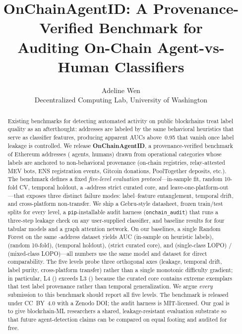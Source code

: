 \documentclass[10pt]{article}
\title{OnChainAgentID: A Provenance-Verified Benchmark for \\
Auditing On-Chain Agent-vs-Human Classifiers}
\author{%
  Adeline Wen \\
  Decentralized Computing Lab, University of Washington%
}
\date{}
\begin{document}
\maketitle

\begin{abstract}
Existing benchmarks for detecting automated activity on public blockchains treat label quality as an afterthought: addresses are labeled by the same behavioral heuristics that serve as classifier features, producing apparent AUCs above~0.95 that vanish once label leakage is controlled. We release \textbf{OnChainAgentID}, a provenance-verified benchmark of \datasetNAddresses{} Ethereum addresses (\datasetNAgents{} agents, \datasetNHumans{} humans) drawn from \datasetNCategories{} operational categories whose labels are anchored to non-behavioral provenance (on-chain registries, relay-attested MEV bots, ENS registration events, Gitcoin donations, PoolTogether deposits, etc.). The benchmark defines a fixed \emph{five-level evaluation protocol}---in-sample fit, random 10-fold CV, temporal holdout, a \datasetStrictCoreN{}-address strict curated core, and leave-one-platform-out---that exposes three distinct failure modes: label--feature entanglement, temporal drift, and cross-platform non-transfer. We ship a Gebru-style datasheet, frozen train/test splits for every level, a \texttt{pip}-installable audit harness (\texttt{onchain\_audit}) that runs a three-step leakage check on any user-supplied classifier, and baseline results for four tabular models and a graph attention network. %
On our baselines, a single Random Forest on the same \datasetNAddresses{}-address dataset yields AUC \cascadeLevelLeakyAuc{} (in-sample on heuristic labels), \randomCvRfAuc{} (random 10-fold), \temporalHoldoutRfAuc{} (temporal holdout), \cascadeLevelStrictCoreAuc{} (strict curated core), and \lopoRfPooledAuc{} (single-class LOPO) / \mixedClassLopoRfAuc{} (mixed-class LOPO)---all numbers use the same model and dataset for direct comparability. The five levels probe three orthogonal axes (leakage, temporal drift, label purity, cross-platform transfer) rather than a single monotonic difficulty gradient; in particular, L4 (\cascadeLevelStrictCoreAuc{}) exceeds L3 (\temporalHoldoutRfAuc{}) because the curated core contains extreme exemplars that test label provenance rather than temporal generalization. We argue \emph{every} submission to this benchmark should report all five levels. The benchmark is released under CC~BY~4.0 with a Zenodo DOI; the audit harness is MIT-licensed. Our goal is to give blockchain-ML researchers a shared, leakage-resistant evaluation substrate so that future agent-detection claims can be compared on equal footing and audited for free.
\end{abstract}
\end{document}
